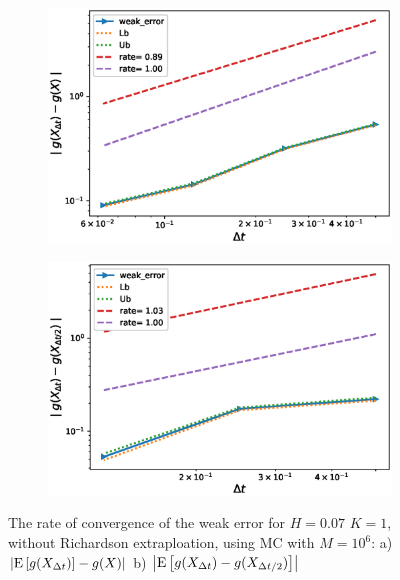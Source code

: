 \documentclass[11pt]{article}
\newcommand{\expt}[1]{\mathrm{E}\left[#1\right]}
\begin{document}
\begin{figure}[h!]
	\centering
	\begin{subfigure}{.4\textwidth}
		\centering
		\includegraphics[width=1\linewidth]{./figures/rBergomi_weak_error_rates/without_richardson/H_007/weak_convergence_order_Bergomi_H_007_K_1_M_10_6_CI_relative}
		\caption{}
		\label{fig:sub3}
	\end{subfigure}%
	\begin{subfigure}{.4\textwidth}
		\centering
		\includegraphics[width=1\linewidth]{./figures/rBergomi_weak_error_rates/without_richardson/H_007/weak_convergence_order_differences_Bergomi_H_007_K_1_M_10_6_CI_relative}
		\caption{}
		\label{fig:sub4}
	\end{subfigure}
	
	\caption{The rate of convergence of the weak error for $H=0.07$ $K=1$, without Richardson extraploation, using MC with $M=10^6$: a) $\abs{\expt{g(X_{\Delta t})}-g(X)}$  b) $\abs{\expt{g(X_{\Delta t})-g(X_{\Delta t/2})}}$ }
	\label{fig:Weak_rate_H_007_without_rich}
\end{figure}
\newpage
\end{document}
